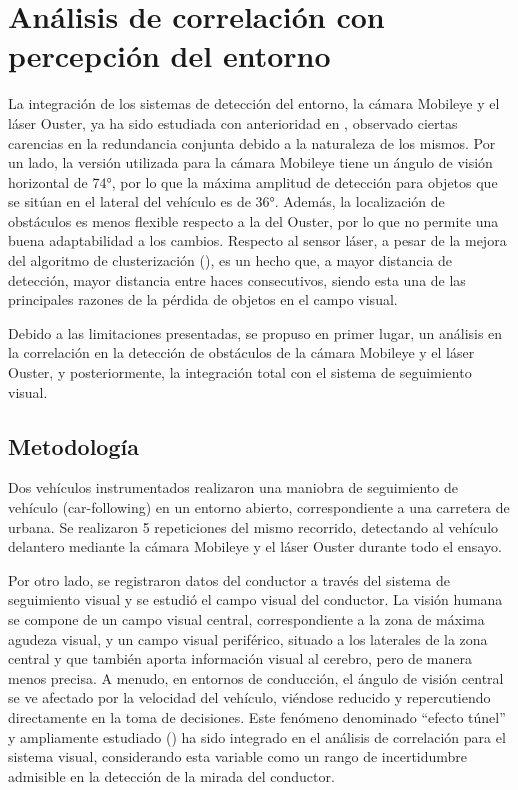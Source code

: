 \section{Análisis de correlación con percepción del entorno}\label{44}
La integración de los sistemas de detección del entorno, la cámara Mobileye y el láser Ouster, ya ha sido estudiada con anterioridad en \textcite{villacieros}, observado ciertas carencias en la redundancia conjunta debido a la naturaleza de los mismos. Por un lado, la versión utilizada para la cámara Mobileye tiene un ángulo de visión horizontal de 74°, por lo que la máxima amplitud de detección para objetos que se sitúan en el lateral del vehículo es de 36°. Además, la localización de obstáculos es menos flexible respecto a la del Ouster, por lo que no permite una buena adaptabilidad a los cambios. Respecto al sensor láser, a pesar de la mejora del algoritmo de clusterización (\cite{clavijo}), es un hecho que, a mayor distancia de detección, mayor distancia entre haces consecutivos, siendo esta una de las principales razones de la pérdida de objetos en el campo visual. 

Debido a las limitaciones presentadas, se propuso en primer lugar, un análisis en la correlación en la detección de obstáculos de la cámara Mobileye y el láser Ouster, y posteriormente, la integración total con el sistema de seguimiento visual.

\subsection{Metodología }\label{441}
Dos vehículos instrumentados realizaron una maniobra de seguimiento de vehículo (car-following) en un entorno abierto, correspondiente a una carretera de urbana. Se realizaron 5 repeticiones del mismo recorrido, detectando al vehículo delantero mediante la cámara Mobileye y el láser Ouster durante todo el ensayo. 

Por otro lado, se registraron datos del conductor a través del sistema de seguimiento visual y se estudió el campo visual del conductor. La visión humana se compone de un campo visual central, correspondiente a la zona de máxima agudeza visual, y un campo visual periférico, situado a los laterales de la zona central y que también aporta información visual al cerebro, pero de manera menos precisa. A menudo, en entornos de conducción, el ángulo de visión central se ve afectado por la velocidad del vehículo, viéndose reducido y repercutiendo directamente en la toma de decisiones. Este fenómeno denominado ``efecto túnel'' y ampliamente estudiado (\cite{edwards}) ha sido integrado en el análisis de correlación para el sistema visual, considerando esta variable como un rango de incertidumbre admisible en la detección de la mirada del conductor.

